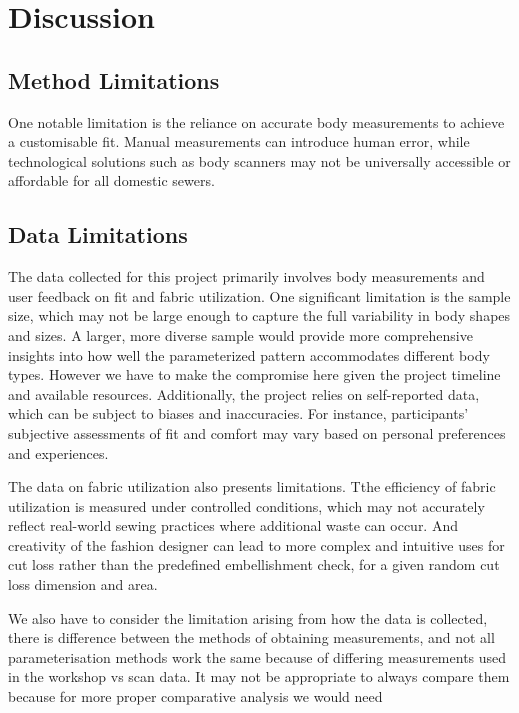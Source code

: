\chapter{Discussion}


\section{Method Limitations} \label{sec:sections}

One notable limitation is the reliance on accurate body measurements to achieve a customisable fit. Manual measurements can introduce human error, while technological solutions such as body scanners may not be universally accessible or affordable for all domestic sewers.

\section{Data Limitations}
The data collected for this project primarily involves body measurements and user feedback on fit and fabric utilization. One significant limitation is the sample size, which may not be large enough to capture the full variability in body shapes and sizes. A larger, more diverse sample would provide more comprehensive insights into how well the parameterized pattern accommodates different body types. However we have to make the compromise here given the project timeline and available resources. Additionally, the project relies on self-reported data, which can be subject to biases and inaccuracies. For instance, participants’ subjective assessments of fit and comfort may vary based on personal preferences and experiences. 

The data on fabric utilization also presents limitations. Tthe efficiency of fabric utilization is measured under controlled conditions, which may not accurately reflect real-world sewing practices where additional waste can occur. And creativity of the fashion designer can lead to more complex and intuitive uses for cut loss rather than the predefined embellishment check, for a given random cut loss dimension and area.

We also have to consider the limitation arising from how the data is collected, there is difference between the methods of obtaining measurements, and not all parameterisation methods work the same because of differing measurements used in the workshop vs scan data. It may not be appropriate to always compare them because for more proper comparative analysis we would need 


